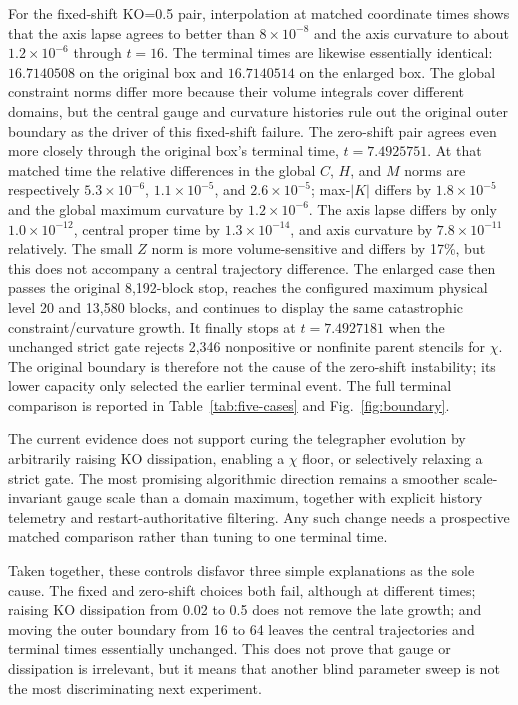 \documentclass[11pt]{article}
\begin{document}
For the fixed-shift KO=0.5 pair, interpolation at matched coordinate times
shows that the axis lapse agrees to better than $8\times10^{-8}$ and the
axis curvature to about $1.2\times10^{-6}$ through $t=16$.  The terminal
times are likewise essentially identical: $16.7140508$ on the original box
and $16.7140514$ on the enlarged box.  The global constraint norms differ
more because their volume integrals cover different domains, but the central
gauge and curvature histories rule out the original outer boundary as the
driver of this fixed-shift failure.  The zero-shift pair agrees even more
closely through the original box's terminal time, $t=7.4925751$.  At that
matched time the relative differences in the global $C$, $H$, and $M$ norms
are respectively $5.3\times10^{-6}$, $1.1\times10^{-5}$, and
$2.6\times10^{-5}$; max-$|K|$ differs by $1.8\times10^{-5}$ and the global
maximum curvature by $1.2\times10^{-6}$.  The axis lapse differs by only
$1.0\times10^{-12}$, central proper time by $1.3\times10^{-14}$, and axis
curvature by $7.8\times10^{-11}$ relatively.  The small $Z$ norm is more
volume-sensitive and differs by 17\%, but this does not accompany a central
trajectory difference.  The enlarged case then passes the original
8,192-block stop, reaches the configured maximum physical level 20 and 13,580
blocks, and continues to display the same catastrophic constraint/curvature
growth.  It finally stops at $t=7.4927181$ when the unchanged strict gate
rejects 2,346 nonpositive or nonfinite parent stencils for $\chi$.  The
original boundary is therefore not the cause of the zero-shift instability;
its lower capacity only selected the earlier terminal event.  The full
terminal comparison is reported in Table~\ref{tab:five-cases} and
Fig.~\ref{fig:boundary}.

The current evidence does not support curing the telegrapher evolution by
arbitrarily raising KO dissipation, enabling a $\chi$ floor, or selectively
relaxing a strict gate.  The most promising algorithmic direction remains a
smoother scale-invariant gauge scale than a domain maximum, together with
explicit history telemetry and restart-authoritative filtering.  Any such
change needs a prospective matched comparison rather than tuning to one
terminal time.

Taken together, these controls disfavor three simple explanations as the sole
cause.  The fixed and zero-shift choices both fail, although at different
times; raising KO dissipation from 0.02 to 0.5 does not remove the late growth;
and moving the outer boundary from 16 to 64 leaves the central trajectories
and terminal times essentially unchanged.  This does not prove that gauge or
dissipation is irrelevant, but it means that another blind parameter sweep is
not the most discriminating next experiment.
\end{document}
